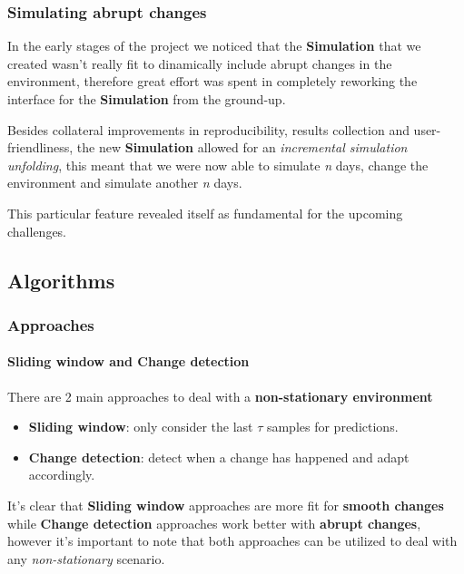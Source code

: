 \documentclass[11pt]{beamer}
\begin{document}

\begin{frame}
\frametitle{Simulating abrupt changes}

In the early stages of the project we noticed that the \textbf{Simulation} that we created wasn't really fit to dinamically include abrupt changes in the environment, therefore great effort was spent in completely reworking the interface for the \textbf{Simulation} from the ground-up.

Besides collateral improvements in reproducibility, results collection and user-friendliness, the new \textbf{Simulation} allowed for an \textit{incremental simulation unfolding}, this meant that we were now able to simulate \textit{n} days, change the environment and simulate another \textit{n} days.

This particular feature revealed itself as fundamental for the upcoming challenges.

\end{frame}


\subsection{Algorithms}


\begin{frame}
\frametitle{Approaches}
\framesubtitle{Sliding window and Change detection}

There are 2 main approaches to deal with a \textbf{non-stationary environment}
\begin{itemize}[label={$\circ$}]
    \item \textbf{Sliding window}: only consider the last $\tau$ samples for predictions.
    \item \textbf{Change detection}: detect when a change has happened and adapt accordingly.
\end{itemize}

It's clear that \textbf{Sliding window} approaches are more fit for \textbf{smooth changes} while \textbf{Change detection} approaches work better with \textbf{abrupt changes}, however it's important to note that both approaches can be utilized to deal with any \textit{non-stationary} scenario.

\end{frame}
\end{document}
